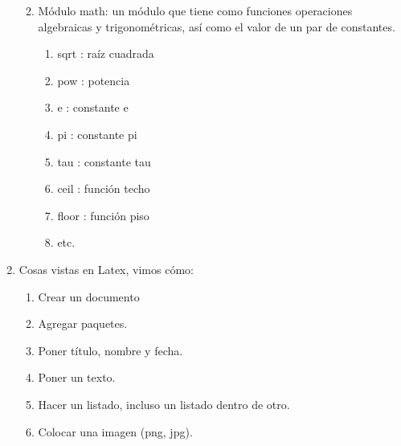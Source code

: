 \documentclass[letterpaper, 12pt, oneside]{article} %
\begin{document}
\begin{enumerate}
\begin{enumerate}
\begin{enumerate}
			\end{enumerate}
			\item Módulo math: un módulo que tiene como funciones operaciones algebraicas y trigonométricas, así como el valor de un par de constantes. 
			\begin{enumerate}
				\item sqrt : raíz cuadrada 
				\item pow : potencia 
				\item e : constante e
				\item pi : constante pi
				\item tau : constante tau
				\item ceil : función techo
				\item floor : función piso
				\item etc.
			\end{enumerate}
		\end{enumerate}
	    \item Cosas vistas en Latex, vimos cómo:
	    \begin{enumerate}
	    	\item Crear un documento
	    	\item Agregar paquetes.
	    	\item Poner título, nombre y fecha. 
	    	\item Poner un texto.
	    	\item Hacer un listado, incluso un listado dentro de otro.
	    	\item Colocar una imagen (png, jpg).
	    \end{enumerate}
	\end{enumerate}
\end{document}

